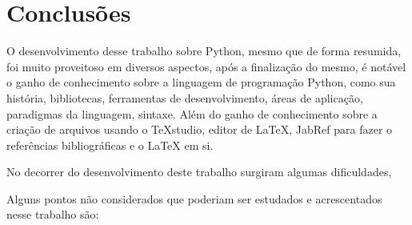 

\chapter{Conclusões}

O desenvolvimento desse trabalho sobre Python, mesmo que de forma resumida, foi muito proveitoso em diversos aspectos, após a finalização do mesmo, é notável o ganho de conhecimento sobre a linguagem de programação Python, como sua história, bibliotecas, ferramentas de desenvolvimento, áreas de aplicação, paradigmas da linguagem, sintaxe. Além do ganho de conhecimento sobre a criação de arquivos usando o TeXstudio, editor de LaTeX, JabRef para fazer o referências bibliográficas e o LaTeX em si.

No decorrer do desenvolvimento deste trabalho surgiram algumas dificuldades,


Alguns pontos não considerados que poderiam ser estudados e acrescentados nesse trabalho são:

